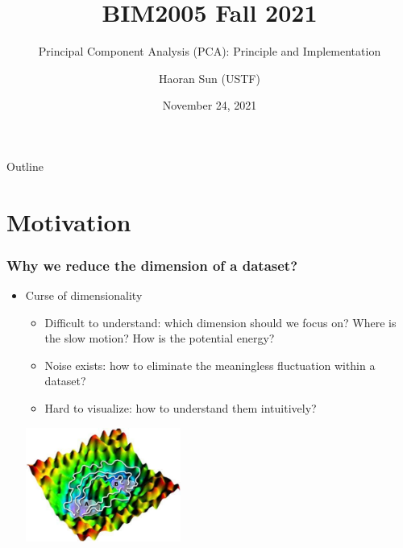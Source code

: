 \documentclass[serif]{beamer}
\title{BIM2005 Fall 2021}
\subtitle{Principal Component Analysis (PCA): Principle and Implementation}
\author{Haoran Sun (USTF)}
\institute{CUHK-Shenzhen}
\date{November 24, 2021}
\begin{document}
\frame{\titlepage}

\begin{frame}{Outline}
    \tableofcontents
\end{frame}



\section{Motivation}
\begin{frame}
    \frametitle{Why we reduce the dimension of a dataset?}
    \begin{itemize}
        \item Curse of dimensionality
        \begin{itemize}
            \item Difficult to \alert{understand}: which dimension should we focus on? Where is the slow motion? How is the potential energy?
            \item \alert{Noise} exists: how to eliminate the meaningless fluctuation within a dataset?
            \item Hard to \alert{visualize}: how to understand them intuitively?
        \end{itemize}

        \begin{center}
            \includegraphics[width=2in]{potential.jpg}
        \end{center}
    \end{itemize}
\end{frame}
\end{document}
